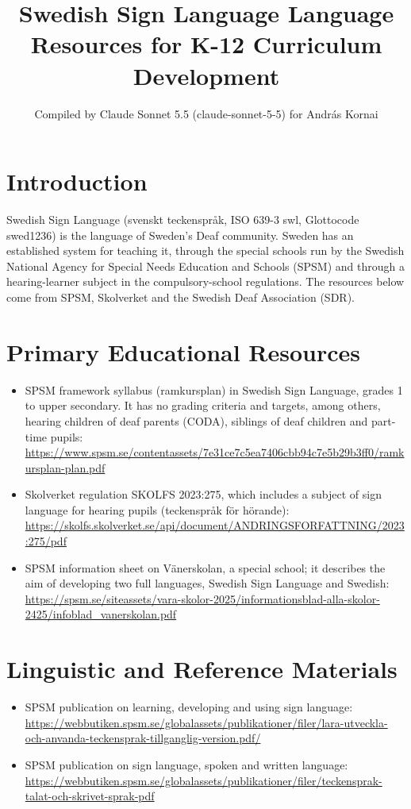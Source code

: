 \documentclass[12pt]{article}
\title{Swedish Sign Language Language Resources for K-12 Curriculum Development}
\author{Compiled by Claude Sonnet 5.5 (claude-sonnet-5-5) for Andr\'as Kornai}
\date{}
\begin{document}
\maketitle

\section{Introduction}
Swedish Sign Language (svenskt teckenspråk, ISO 639-3 swl, Glottocode swed1236) is the language of Sweden's Deaf community. Sweden has an established system for teaching it, through the special schools run by the Swedish National Agency for Special Needs Education and Schools (SPSM) and through a hearing-learner subject in the compulsory-school regulations. The resources below come from SPSM, Skolverket and the Swedish Deaf Association (SDR).

\section{Primary Educational Resources}
\begin{itemize}
\item SPSM framework syllabus (ramkursplan) in Swedish Sign Language, grades 1 to upper secondary. It has no grading criteria and targets, among others, hearing children of deaf parents (CODA), siblings of deaf children and part-time pupils: \url{https://www.spsm.se/contentassets/7e31ce7c5ea7406cbb94c7e5b29b3ff0/ramkursplan-plan.pdf}
\item Skolverket regulation SKOLFS 2023:275, which includes a subject of sign language for hearing pupils (teckenspråk för hörande): \url{https://skolfs.skolverket.se/api/document/ANDRINGSFORFATTNING/2023:275/pdf}
\item SPSM information sheet on Vänerskolan, a special school; it describes the aim of developing two full languages, Swedish Sign Language and Swedish: \url{https://spsm.se/siteassets/vara-skolor-2025/informationsblad-alla-skolor-2425/infoblad_vanerskolan.pdf}
\end{itemize}

\section{Linguistic and Reference Materials}
\begin{itemize}
\item SPSM publication on learning, developing and using sign language: \url{https://webbutiken.spsm.se/globalassets/publikationer/filer/lara-utveckla-och-anvanda-teckensprak-tillganglig-version.pdf/}
\item SPSM publication on sign language, spoken and written language: \url{https://webbutiken.spsm.se/globalassets/publikationer/filer/teckensprak-talat-och-skrivet-sprak-pdf}
\end{itemize}
\end{document}
